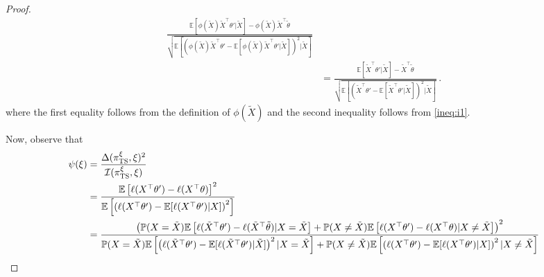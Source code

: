 \documentclass[letter, 12pt]{report}
\newcommand{\E}{\mathbb E}
\newcommand{\I}{\mathcal{I}}
\newcommand{\1}{\mathbf{1}}
\newcommand{\mP}{\mathbb{P}}
\newcommand{\ts}{\textsc{TS}\xspace}
\theoremstyle{plain}
\theoremstyle{definition}
\theoremstyle{remark}
\begin{document}
\begin{proof}
\begin{align}
        \frac{
            \E[\phi(\tilde{X})\tilde{X}^\top \theta'|\tilde{X}] - \phi(\tilde{X})\tilde{X}^\top \tilde{\theta}
        }{
            \sqrt{
                \E\left[
                    \left(\phi(\tilde{X})\tilde{X}^\top \theta' -
                    \E[\phi(\tilde{X})\tilde{X}^\top \theta'|\tilde{X}]\right)^2
                    |\tilde{X}
                    \right]
            }
        } \nonumber
        \\
         & =
        \frac{
            \E[\tilde{X}^\top \theta'|\tilde{X}] - \tilde{X}^\top \tilde{\theta}
        }{
            \sqrt{
                \E\left[
                    \left(\tilde{X}^\top \theta' -
                    \E[\tilde{X}^\top \theta'|\tilde{X}]\right)^2
                    |\tilde{X}
                    \right]
            }
        }\,. \label{eq:ir-ts-reduction-to-linear}
    \end{align}
    where the first equality follows from the
    definition of $\phi(\tilde{X})$ and the second inequality follows from \ref{ineq:i1}.

    Now, observe that
    \begin{align*}
        \psi(\xi)
         & =
        \frac{\Delta(\pi^\xi_\ts, \xi)^2}{\I(\pi^\xi_\ts, \xi)}
        \\
         & =
        \frac{
            \E\left[
                \ell(X^\top \theta') - \ell(X^\top \theta)
                \right]^2
        }{
            \E\left[
                \left(\ell(X^\top \theta') - \E[\ell(X^\top \theta')|X]\right)^2
                \right]
        }
        \\
         & =
        \frac{
            \left(
            \mP(X = \tilde{X})\E\left[
                \ell(\tilde{X}^\top \theta') - \ell(\tilde{X}^\top \tilde{\theta})
                | X = \tilde{X}
                \right]
            +
            \mP(X \neq \tilde{X})\E\left[
                \ell(X^\top \theta') - \ell(X^\top \theta)
                | X \neq \tilde{X}
                \right]
            \right)^2
        }{
            \mP(X = \tilde{X})\E\left[
                \left(\ell(\tilde{X}^\top \theta') - \E[\ell(\tilde{X}^\top \theta')|\tilde{X}]\right)^2
                | X = \tilde{X}
                \right]
            +
            \mP(X \neq \tilde{X})\E\left[
                \left(\ell(X^\top \theta') - \E[\ell(X^\top \theta')|X]\right)^2
                | X \neq \tilde{X}
                \right]
        }
    \end{align*}


\end{proof}
\end{document}
